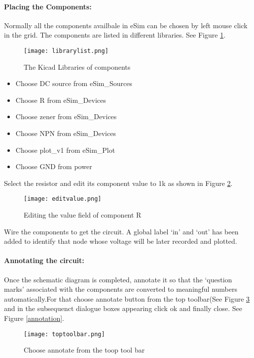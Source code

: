 \paragraph{Placing the Components:} Normally all the components availbale in eSim can be chosen by left mouse click in the grid. The components are listed in different libraries. See Figure \ref{librarylist}.

\begin{figure}[H]
\centering
\texttt{[image: librarylist.png]}
\caption{The Kicad Libraries of components}
\label{librarylist}
\end{figure}

\begin{itemize}
\item
Choose DC source from eSim\_Sources
\item
Choose R from eSim\_Devices
\item
Choose zener from eSim\_Devices
\item
Choose NPN from eSim\_Devices
\item
Choose plot\_v1 from eSim\_Plot

\item
Choose GND from power
\end{itemize}

Select the resistor and edit its component value to 1k as shown in Figure \ref{editvalue}.

\begin{figure}[H]
\centering
\texttt{[image: editvalue.png]}
\caption{Editing the value field of component R}
\label{editvalue}
\end{figure}

Wire the components to get the circuit. A global label `in' and `out' has been added to identify that node whose voltage will be later recorded and plotted.

\paragraph{Annotating the circuit:} Once the schematic diagram is completed, annotate it so that the `question marks' associated with the components are converted to meaningful numbers automatically.For that choose annotate button from the top toolbar(See Figure \ref{toptoolbar} and in the subsequenct dialogue boxes appearing click ok and finally close. See Figure \ref{annotation}.

\begin{figure}[H]
\centering
\texttt{[image: toptoolbar.png]}
\caption{Choose annotate from the toop tool bar}
\label{toptoolbar}
\end{figure}



